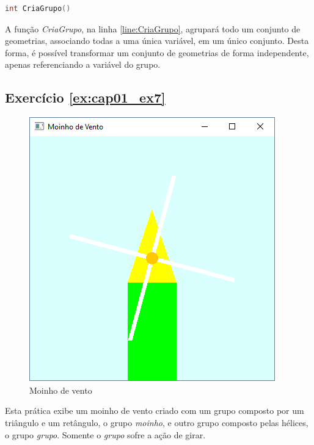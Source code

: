 \begin{lstlisting}[label={func:CriaGrupo},language=C++]
int CriaGrupo()
\end{lstlisting}
A função \emph{CriaGrupo}, na linha \ref{line:CriaGrupo}, agrupará todo um conjunto de geometrias, associando todas a uma única variável, em um único conjunto. Desta forma, é possível transformar um conjunto de geometrias de forma independente, apenas referenciando a variável do grupo.

\subsection*{Exercício \ref{ex:cap01_ex7}}
\begin{figure}[ht]
  \centerline{\includegraphics[width=.5\textwidth]{img/cap1_ex7.png}}
  \caption{Moinho de vento}
  \label{fig:cap01_ex7}
\end{figure}
Esta prática exibe um moinho de vento criado com um grupo composto por um triângulo e um retângulo, o grupo \emph{moinho}, e outro grupo composto pelas hélices, o grupo \emph{grupo}. Somente o \emph{grupo} sofre a ação de girar. 

